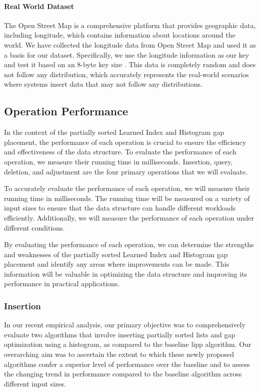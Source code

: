 \documentclass[11pt,a4paper]{article}
\newcommand{\learnindex}{\textsf{Learned Index}\xspace}
\begin{document}
\paragraph{Real World Dataset}
The Open Street Map is a comprehensive platform that provides geographic data, including longitude, which contains information about locations around the world. We have collected the longitude data from Open Street Map and used it as a basis for our dataset. Specifically, we use the longitude information as our key and test it based on an 8-byte key size \cite{openstreetmaponaws}. This data is completely random and does not follow any distribution, which accurately represents the real-world scenarios where systems insert data that may not follow any distributions.


\subsection{Operation Performance}
In the context of the partially sorted \learnindex and Histogram gap placement, the performance of each operation is crucial to ensure the efficiency and effectiveness of the data structure. To evaluate the performance of each operation, we measure their running time in milliseconds. Insertion, query, deletion, and adjustment are the four primary operations that we will evaluate. 

To accurately evaluate the performance of each operation, we will measure their running time in milliseconds. The running time will be measured on a variety of input sizes to ensure that the data structure can handle different workloads efficiently. Additionally, we will measure the performance of each operation under different conditions. 

By evaluating the performance of each operation, we can determine the strengths and weaknesses of the partially sorted \learnindex and Histogram gap placement and identify any areas where improvements can be made. This information will be valuable in optimizing the data structure and improving its performance in practical applications.
\subsubsection{Insertion}
In our recent empirical analysis, our primary objective was to comprehensively evaluate two algorithms that involve inserting partially sorted lists and gap optimization using a histogram, as compared to the baseline \acrshort{lipp} algorithm. Our overarching aim was to ascertain the extent to which these newly proposed algorithms confer a superior level of performance over the baseline and to assess the changing trend in performance compared to the baseline algorithm across different input sizes.
\end{document}
